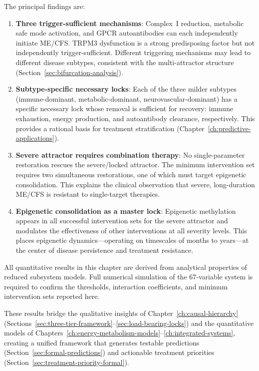 The principal findings are:

\begin{enumerate}
    \item \textbf{Three trigger-sufficient mechanisms}: Complex~I reduction, metabolic safe mode activation, and GPCR autoantibodies can each independently initiate ME/CFS. TRPM3 dysfunction is a strong predisposing factor but not independently trigger-sufficient. Different triggering mechanisms may lead to different disease subtypes, consistent with the multi-attractor structure (Section~\ref{sec:bifurcation-analysis}).

    \item \textbf{Subtype-specific necessary locks}: Each of the three milder subtypes (immune-dominant, metabolic-dominant, neurovascular-dominant) has a specific necessary lock whose removal is sufficient for recovery: immune exhaustion, energy production, and autoantibody clearance, respectively. This provides a rational basis for treatment stratification (Chapter~\ref{ch:predictive-applications}).

    \item \textbf{Severe attractor requires combination therapy}: No single-parameter restoration rescues the severe/locked attractor. The minimum intervention set requires two simultaneous restorations, one of which must target epigenetic consolidation. This explains the clinical observation that severe, long-duration ME/CFS is resistant to single-target therapies.

    \item \textbf{Epigenetic consolidation as a master lock}: Epigenetic methylation appears in all successful intervention sets for the severe attractor and modulates the effectiveness of other interventions at all severity levels. This places epigenetic dynamics---operating on timescales of months to years---at the center of disease persistence and treatment resistance.
\end{enumerate}

All quantitative results in this chapter are derived from analytical properties of reduced subsystem models. Full numerical simulation of the 67-variable system is required to confirm the thresholds, interaction coefficients, and minimum intervention sets reported here.

These results bridge the qualitative insights of Chapter~\ref{ch:causal-hierarchy} (Sections~\ref{sec:three-tier-framework}--\ref{sec:load-bearing-locks}) and the quantitative models of Chapters~\ref{ch:energy-metabolism-models}--\ref{ch:integrated-systems}, creating a unified framework that generates testable predictions (Section~\ref{sec:formal-predictions}) and actionable treatment priorities (Section~\ref{sec:treatment-priority-formal}).


